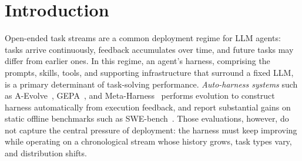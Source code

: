 





\section{Introduction}
\label{sec:intro}

{Open-ended task streams are a common deployment regime for LLM agents: tasks arrive continuously, feedback accumulates over time, and future tasks may differ from earlier ones. }
In this regime, an agent's harness, comprising the prompts, skills, tools, and supporting infrastructure that surround a fixed LLM, is a primary determinant of task-solving performance. \emph{Auto-harness systems} such as A-Evolve~\cite{lin2026position}, GEPA~\cite{agrawal2025gepa}, and Meta-Harness~\cite{lee2026meta} performs evolution to construct harness automatically from execution feedback, and report substantial gains on static offline benchmarks such as SWE-bench~\cite{jimenez2024swe}. Those evaluations, however, do not capture the central pressure of deployment: the harness must keep improving while operating on a chronological stream whose history grows, task types vary, and distribution shifts.








